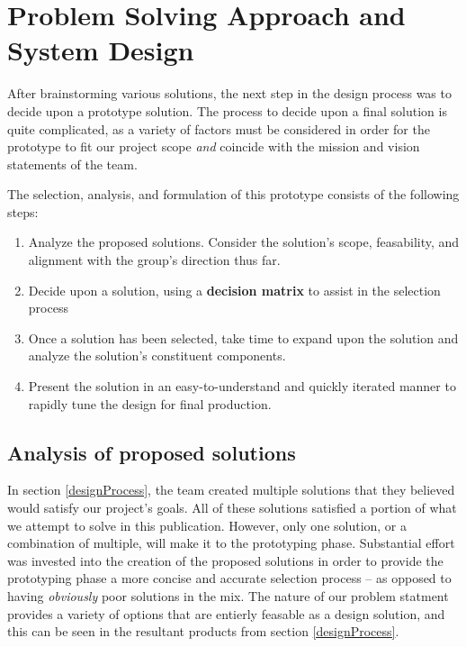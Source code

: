 \documentclass[../main.tex]{subfiles}
\begin{document}
\section{Problem Solving Approach and System Design}\label{prototypes}
After brainstorming various solutions, the next step in the design process was to decide upon a prototype solution. The process to decide upon a final solution is quite complicated, as a variety of factors must be considered in order for the prototype to fit our project scope \emph{and} coincide with the mission and vision statements of the team.\par
The selection, analysis, and formulation of this prototype consists of the following steps:\par
\begin{singlespace}
\begin{enumerate}
    \item Analyze the proposed solutions. Consider the solution's scope, feasability, and alignment with the group's direction thus far.
    \item Decide upon a solution, using a \textbf{decision matrix} to assist in the selection process
    \item Once a solution has been selected, take time to expand upon the solution and analyze the solution's constituent components.
    \item Present the solution in an easy-to-understand and quickly iterated manner to rapidly tune the design for final production.
\end{enumerate}
\end{singlespace}

\newpage
\subsection{Analysis of proposed solutions}
In section \ref{designProcess}, the team created multiple solutions that they believed would satisfy our project's goals. All of these solutions satisfied a portion of what we attempt to solve in this publication. However, only one solution, or a combination of multiple, will make it to the prototyping phase. Substantial effort was invested into the creation of the proposed solutions in order to provide the prototyping phase a more concise and accurate selection process -- as opposed to having \emph{obviously} poor solutions in the mix. The nature of our problem statment provides a variety of options that are entierly feasable as a design solution, and this can be seen in the resultant products from section \ref{designProcess}.\par
\end{document}
